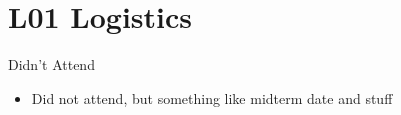 \section{L01 Logistics}
Didn't Attend
\begin{itemize}
	\item Did not attend, but something like midterm date and stuff
\end{itemize}
